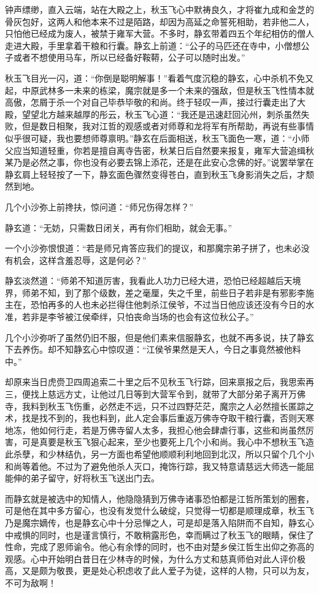 钟声缥缈，直入云端，站在大殿之上，秋玉飞心中默祷良久，才将崔九成和金芝的骨灰包好，这两人和他本来不过是陌路，却因为高延之命誓死相助，若非他二人，只怕他已经成为废人，被禁于雍军大营。不多时，静玄带着四五个年纪相仿的僧人走进大殿，手里拿着干粮和行囊。静玄上前道：“公子的马匹还在寺中，小僧想公子或者不想使用马车，所以已经备好鞍鞯，公子可以随时出发。”

秋玉飞目光一闪，道：“你倒是聪明解事！”看着气度沉稳的静玄，心中杀机不免又起，中原武林多一未来的栋梁，魔宗就是多一个未来的强敌，但是秋玉飞性情本就高傲，怎屑于杀一个对自己毕恭毕敬的和尚。终于轻叹一声，接过行囊走出了大殿，望望北方越来越厚的彤云，秋玉飞心道：“我还是迅速赶回沁州，刺杀虽然失败，但是数日相聚，我对江哲的观感或者对师尊和龙将军有所帮助，再说有些事情似乎很可疑，我也要想师尊禀明。”静玄在后面相送，秋玉飞面色一寒，道：“小师父应当知道轻重，你若是擅自离寺告密，秋某日后自然要来报复，雍军大营追缉秋某乃是必然之事，你也没有必要去锦上添花，还是在此安心念佛的好。”说罢举掌在静玄肩上轻轻按了一下，静玄面色骤然变得苍白，直到秋玉飞身影消失之后，才颓然到地。

几个小沙弥上前搀扶，惊问道：“师兄伤得怎样？”

静玄道：“无妨，只需数日闭关，再有你们相助，就会无事。”

一个小沙弥恨恨道：“若是师兄肯答应我们的提议，和那魔宗弟子拼了，也未必没有机会，这样含羞忍辱，这是何必？”

静玄淡然道：“师弟不知道厉害，我看此人功力已经大进，恐怕已经超越后天境界，师弟不知，到了那个级数，差之毫厘，失之千里，前些日子若非是有邪影李施主在，恐怕再多的人也未必拦得住他刺杀江侯爷，不过当日他应该还没有今日的水准，若非是李爷被江侯牵绊，只怕丧命当场的也会有这位秋公子。”

几个小沙弥听了虽然仍旧不服，但是他们素来信服静玄，也就不再多说，扶了静玄下去养伤。却不知静玄心中惊叹道：“江侯爷果然是天人，今日之事竟然被他料中。”

却原来当日虎赍卫四周追索二十里之后不见秋玉飞行踪，回来禀报之后，我思索再三，便找上慈远方丈，让他过几日等到大营军令到，就带了大部分弟子离开万佛寺，我料到秋玉飞伤重，必然走不远，只不过四野茫茫，魔宗之人必然擅长匿踪之术，找是找不到的，我也料到，此人定会事后重返万佛寺夺取干粮行囊，否则天寒地冻，他如何行走，若是万佛寺留人太多，我担心他会肆虐行事，这些和尚虽然厉害，可是真要是秋玉飞狠心起来，至少也要死上几个小和尚。我心中不想秋玉飞造此杀孽，和少林结仇，另一方面也希望他顺顺利利地回到北汉，所以只留个几个小和尚等着他。不过为了避免他杀人灭口，掩饰行踪，我又特意请慈远大师选一能屈能伸的弟子留守，好将秋玉飞送出门去。

而静玄就是被选中的知情人，他隐隐猜到万佛寺诸事恐怕都是江哲所策划的圈套，可是他在其中多方留心，也没有发觉什么破绽，只觉得一切都是顺理成章，秋玉飞乃是魔宗嫡传，也是静玄心中十分忌惮之人，可是却是落入陷阱而不自知，静玄心中戒惧的同时，也是谨言慎行，不敢稍露形色，幸而瞒过了秋玉飞的眼睛，保住了性命，完成了恩师谕令。他心有余悸的同时，也不由对楚乡侯江哲生出仰之弥高的观感。心中开始明白昔日在少林寺的时候，为什么方丈和慈真师伯对此人评价极高，又是颇为敬畏，更是处心积虑收了此人爱子为徒，这样的人物，只可以为友，不可为敌啊！

